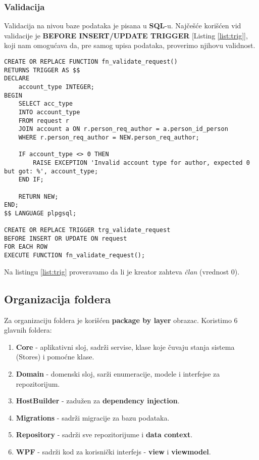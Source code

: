 \subsubsection*{Validacija}
\par Validacija na nivou baze podataka je pisana u \textbf{SQL}-u. Najčešće korišćen
vid validacije je \textbf{BEFORE INSERT/UPDATE TRIGGER} [Listing \ref{list:trig}], koji nam omogućava da, pre samog upisa podataka, proverimo njihovu validnost.
\begin{lstlisting}[caption={Primer validacije pomoću trigera}, captionpos=b, label=list:trig]
CREATE OR REPLACE FUNCTION fn_validate_request()
RETURNS TRIGGER AS $$
DECLARE
	account_type INTEGER;
BEGIN
	SELECT acc_type
	INTO account_type
	FROM request r
	JOIN account a ON r.person_req_author = a.person_id_person
	WHERE r.person_req_author = NEW.person_req_author;

	IF account_type <> 0 THEN
		RAISE EXCEPTION 'Invalid account type for author, expected 0 but got: %', account_type;
	END IF;

	RETURN NEW;
END;
$$ LANGUAGE plpgsql;

CREATE OR REPLACE TRIGGER trg_validate_request
BEFORE INSERT OR UPDATE ON request
FOR EACH ROW
EXECUTE FUNCTION fn_validate_request();
\end{lstlisting}
\par Na listingu \ref{list:trig} proveravamo da li je kreator zahteva \textit{član} (vrednost 0).
\subsection{Organizacija foldera}
\par Za organizaciju foldera je korišćen \textbf{package by layer} obrazac. Koristimo 6 glavnih foldera:
\begin{enumerate}
    \item \textbf{Core} - aplikativni sloj, sadrži servise, klase koje čuvaju stanja sistema (Stores) i pomoćne klase.
    \item \textbf{Domain} - domenski sloj, sarži enumeracije, modele i interfejse za repozitorijum.
    \item \textbf{HostBuilder} - zadužen za \textbf{dependency injection}.
    \item \textbf{Migrations} - sadrži migracije za bazu podataka.
    \item \textbf{Repository} - sadrži sve repozitorijume i \textbf{data context}.
    \item \textbf{WPF} - sadrži kod za korisnički interfejs -  \textbf{view} i \textbf{viewmodel}.
\end{enumerate}